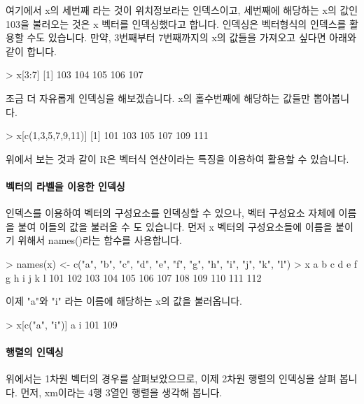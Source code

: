 여기에서 x의 세번째 라는 것이 위치정보라는 인덱스이고, 세번째에 해당하는 x의 값인 103을 불러오는 것은 x 벡터를 인덱싱했다고 합니다. 
인덱싱은 벡터형식의 인덱스를 활용할 수도 있습니다.
만약, 3번째부터 7번째까지의 x의 값들을 가져오고 싶다면 아래와 같이 합니다. 

\begin{Schunk}
\begin{Soutput}
> x[3:7]
[1] 103 104 105 106 107
\end{Soutput}
\end{Schunk}

조금 더 자유롭게 인덱싱을 해보겠습니다. 
x의 홀수번째에 해당하는 값들만 뽑아봅니다. 

\begin{Schunk}
\begin{Soutput}
> x[c(1,3,5,7,9,11)]
[1] 101 103 105 107 109 111
\end{Soutput}
\end{Schunk}

위에서 보는 것과 같이 R은 벡터식 연산이라는 특징을 이용하여 활용할 수 있습니다.

\paragraph{벡터의 라벨을 이용한 인덱싱} 
인덱스를 이용하여 벡터의 구성요소를 인덱싱할 수 있으나, 벡터 구성요소 자체에 이름을 붙여 이들의 값을 불러올 수 도 있습니다. 
먼저 x 벡터의 구성요소들에 이름을 붙이기 위해서 names()라는 함수를 사용합니다. 

\begin{Schunk}
\begin{Soutput}
> names(x) <- c("a", "b", "c", "d", "e", "f", "g", "h", "i", "j", "k", "l")
> x
  a   b   c   d   e   f   g   h   i   j   k   l 
101 102 103 104 105 106 107 108 109 110 111 112 
\end{Soutput}
\end{Schunk}

이제 "a"와 "i" 라는 이름에 해당하는 x의 값을 불러옵니다. 

\begin{Schunk}
\begin{Soutput}
> x[c("a", "i")]
  a   i 
101 109 
\end{Soutput}
\end{Schunk}

\paragraph{행렬의 인덱싱} 
위에서는 1차원 벡터의 경우를 살펴보았으므로, 이제 2차원 행렬의 인덱싱을 살펴 봅니다. 
먼저, xm이라는 4행 3열인 행렬을 생각해 봅니다. 

